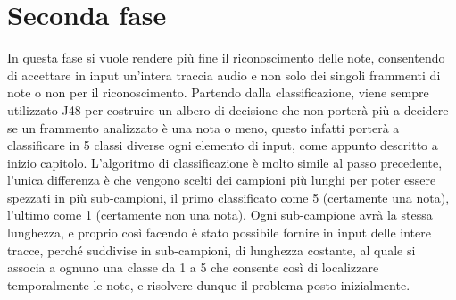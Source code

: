 \section{Seconda fase}
In questa fase si vuole rendere più fine il riconoscimento delle note, consentendo di accettare in input un'intera traccia audio e non solo dei singoli frammenti di note o non per il riconoscimento. Partendo dalla classificazione, viene sempre utilizzato J48 per costruire un albero di decisione che non porterà più a decidere se un frammento analizzato è una nota o meno, questo infatti porterà a classificare in 5 classi diverse ogni elemento di input, come appunto descritto a inizio capitolo. L'algoritmo di classificazione è molto simile al passo precedente, l'unica differenza è che vengono scelti dei campioni più lunghi per poter essere spezzati in più sub-campioni, il primo classificato come 5 (certamente una nota), l'ultimo come 1 (certamente non una nota). Ogni sub-campione avrà la stessa lunghezza, e proprio così facendo è stato possibile fornire in input delle intere tracce, perché suddivise in sub-campioni, di lunghezza costante, al quale si associa a ognuno una classe da 1 a 5 che consente così di localizzare temporalmente le note, e risolvere dunque il problema posto inizialmente.\\

